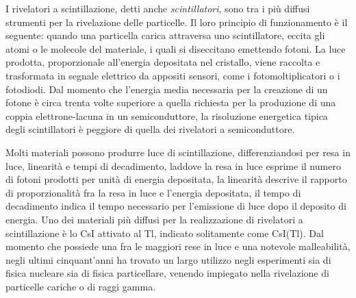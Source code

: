 I rivelatori a scintillazione, detti anche \emph{scintillatori}, sono tra i più diffusi strumenti per la rivelazione delle particelle.
Il loro principio di funzionamento è il seguente: quando una particella carica attraversa uno scintillatore, eccita gli atomi o le molecole del materiale, i quali si diseccitano emettendo fotoni. 
La luce prodotta, proporzionale all'energia depositata nel cristallo, viene raccolta e trasformata in segnale elettrico da appositi sensori, come i fotomoltiplicatori o i fotodiodi.
Dal momento che l'energia media necessaria per la creazione di un fotone è circa trenta volte superiore a quella richiesta per la produzione di una coppia elettrone-lacuna in un semiconduttore, la risoluzione energetica tipica degli scintillatori è peggiore di quella dei rivelatori a semiconduttore.

Molti materiali possono produrre luce di scintillazione, differenziandosi per resa in luce, linearità e tempi di decadimento, laddove la resa in luce esprime il numero di fotoni prodotti per unità di energia depositata, la linearità descrive il rapporto di proporzionalità fra la resa in luce e l'energia depositata, il tempo di decadimento indica il tempo necessario per l'emissione di luce dopo il deposito di energia.
Uno dei materiali più diffusi per la realizzazione di rivelatori a scintillazione è lo CsI attivato al Tl, indicato solitamente come CsI(Tl). 
Dal momento che possiede una fra le maggiori rese in luce e una notevole malleabilità, negli ultimi cinquant'anni ha trovato un largo utilizzo negli esperimenti sia di fisica nucleare sia di fisica particellare, venendo impiegato nella rivelazione di particelle cariche o di raggi gamma.


